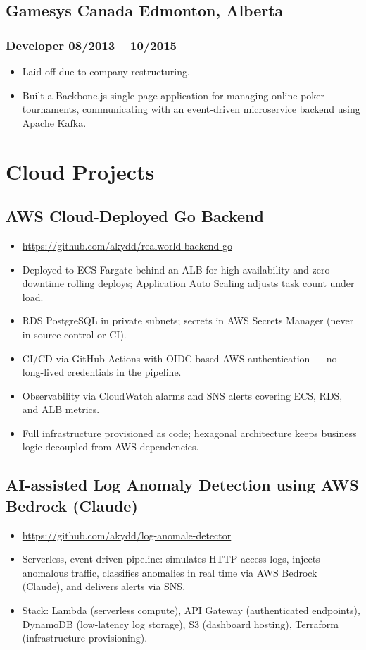 \documentclass[10pt]{article}
\begin{document}
\subsection{Gamesys Canada \hfill Edmonton, Alberta}
\subsubsection{Developer \hfill 08/2013 -- 10/2015}
\begin{itemize}
  \item Laid off due to company restructuring.
  \item Built a Backbone.js single-page application for managing online poker tournaments, communicating with an event-driven microservice backend using Apache Kafka.
\end{itemize}

\section{Cloud Projects}

\subsection{AWS Cloud-Deployed Go Backend}
\begin{itemize}
  \item \url{https://github.com/akydd/realworld-backend-go}
  \item Deployed to ECS Fargate behind an ALB for high availability and zero-downtime rolling deploys; Application Auto Scaling adjusts task count under load.
  \item RDS PostgreSQL in private subnets; secrets in AWS Secrets Manager (never in source control or CI).
  \item CI/CD via GitHub Actions with OIDC-based AWS authentication --- no long-lived credentials in the pipeline.
  \item Observability via CloudWatch alarms and SNS alerts covering ECS, RDS, and ALB metrics.
  \item Full infrastructure provisioned as code; hexagonal architecture keeps business logic decoupled from AWS dependencies.
\end{itemize}

\subsection{AI-assisted Log Anomaly Detection using AWS Bedrock (Claude)}
\begin{itemize}
  \item \url{https://github.com/akydd/log-anomale-detector}
  \item Serverless, event-driven pipeline: simulates HTTP access logs, injects anomalous traffic, classifies anomalies in real time via AWS Bedrock (Claude), and delivers alerts via SNS.
  \item Stack: Lambda (serverless compute), API Gateway (authenticated endpoints), DynamoDB (low-latency log storage), S3 (dashboard hosting), Terraform (infrastructure provisioning).
\end{itemize}
\end{document}
